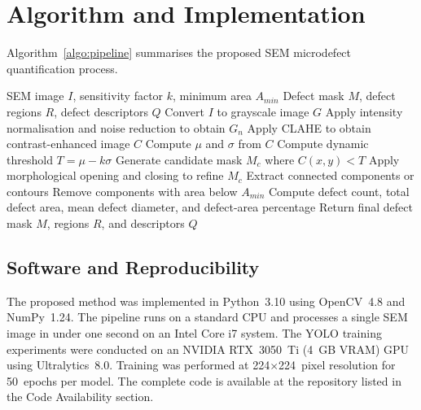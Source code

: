 \documentclass[pdflatex,sn-mathphys-num,iicol]{sn-jnl}
\theoremstyle{thmstyleone}
\theoremstyle{thmstyletwo}
\theoremstyle{thmstylethree}
\begin{document}
\section{Algorithm and Implementation}\label{sec:algorithm}

Algorithm~\ref{algo:pipeline} summarises the proposed SEM microdefect
quantification process.

\begin{algorithm}
\caption{SEM microdefect quantification for perovskite photovoltaic films}
\label{algo:pipeline}
\begin{algorithmic}[1]
\Require SEM image $I$, sensitivity factor $k$, minimum area $A_{min}$
\Ensure Defect mask $M$, defect regions $R$, defect descriptors $Q$
\State Convert $I$ to grayscale image $G$
\State Apply intensity normalisation and noise reduction to obtain $G_n$
\State Apply CLAHE to obtain contrast-enhanced image $C$
\State Compute $\mu$ and $\sigma$ from $C$
\State Compute dynamic threshold $T = \mu - k\sigma$
\State Generate candidate mask $M_c$ where $C(x,y)<T$
\State Apply morphological opening and closing to refine $M_c$
\State Extract connected components or contours
\State Remove components with area below $A_{min}$
\State Compute defect count, total defect area, mean defect diameter,
       and defect-area percentage
\State Return final defect mask $M$, regions $R$, and descriptors $Q$
\end{algorithmic}
\end{algorithm}

\subsection{Software and Reproducibility}\label{subsec:software}

The proposed method was implemented in Python~3.10 using OpenCV~4.8
and NumPy~1.24. The pipeline runs on a standard CPU and processes
a single SEM image in under one second on an Intel Core i7 system.
The YOLO training experiments were conducted on an NVIDIA RTX~3050~Ti
(4~GB VRAM) GPU using Ultralytics~8.0. Training was performed at
224$\times$224~pixel resolution for 50~epochs per model. The complete
code is available at the repository listed in the Code Availability
section.
\end{document}
